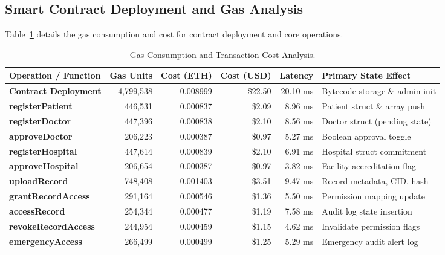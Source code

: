 \documentclass[11pt,a4paper]{article}
\begin{document}
\subsection{Smart Contract Deployment and Gas Analysis}
Table~\ref{tab:gas_cost} details the gas consumption and cost for contract deployment and core operations.

\begin{table}[htbp]
\centering
\small
\caption{Gas Consumption and Transaction Cost Analysis.}
\label{tab:gas_cost}
\begin{tabularx}{\textwidth}{lrrrrX}
\toprule
\textbf{Operation / Function} & \textbf{Gas Units} & \textbf{Cost (ETH)} & \textbf{Cost (USD)} & \textbf{Latency} & \textbf{Primary State Effect} \\
\midrule
\textbf{Contract Deployment} & 4,799,538 & 0.008999 & \$22.50 & 20.10 ms & Bytecode storage \& admin init \\
\textbf{registerPatient} & 446,531 & 0.000837 & \$2.09 & 8.96 ms & Patient struct \& array push \\
\textbf{registerDoctor} & 447,396 & 0.000838 & \$2.10 & 8.56 ms & Doctor struct (pending state) \\
\textbf{approveDoctor} & 206,223 & 0.000387 & \$0.97 & 5.27 ms & Boolean approval toggle \\
\textbf{registerHospital} & 447,614 & 0.000839 & \$2.10 & 6.91 ms & Hospital struct commitment \\
\textbf{approveHospital} & 206,654 & 0.000387 & \$0.97 & 3.82 ms & Facility accreditation flag \\
\textbf{uploadRecord} & 748,408 & 0.001403 & \$3.51 & 9.47 ms & Record metadata, CID, hash \\
\textbf{grantRecordAccess} & 291,164 & 0.000546 & \$1.36 & 5.50 ms & Permission mapping update \\
\textbf{accessRecord} & 254,344 & 0.000477 & \$1.19 & 7.58 ms & Audit log state insertion \\
\textbf{revokeRecordAccess} & 244,954 & 0.000459 & \$1.15 & 4.62 ms & Invalidate permission flags \\
\textbf{emergencyAccess} & 266,499 & 0.000499 & \$1.25 & 5.29 ms & Emergency audit alert log \\
\bottomrule
\end{tabularx}
\end{table}
\end{document}
